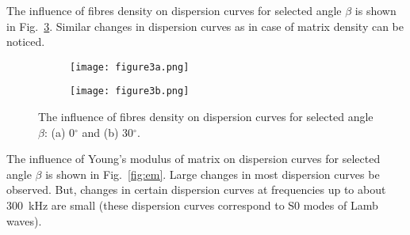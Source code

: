 \documentclass[preprint,12pt]{elsarticle}
\begin{document}
The influence of fibres density on dispersion curves for selected angle \(\beta\) is 
shown 
in Fig.~\ref{fig:rhof}. Similar changes in dispersion curves as in case of matrix density 
can be noticed.

\begin{figure} [h!]
	\centering
	\begin{subfigure}[b]{0.49\textwidth}
		\centering
		\texttt{[image: figure3a.png]}
		\caption{}
		\label{fig:rhof0}
	\end{subfigure}
	\hfill
	\begin{subfigure}[b]{0.49\textwidth}
		\centering
		\texttt{[image: figure3b.png]}
		\caption{}
		\label{fig:rhof30}
	\end{subfigure}
	\caption{The influence of fibres density on dispersion curves for selected angle 
	\(\beta\): (a) 0\(^{\circ}\) and (b) 30\(^{\circ}\).} 
	\label{fig:rhof}
\end{figure}

The influence of Young's modulus of matrix on dispersion curves for selected angle 
\(\beta\) is shown in Fig.~\ref{fig:em}. Large changes in most dispersion curves be 
observed. But, changes in certain dispersion curves at frequencies up to about 
300~kHz are small (these dispersion curves correspond to S0 modes of Lamb waves).
\end{document}

